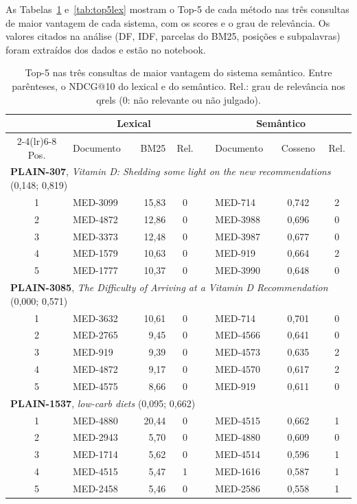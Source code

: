 \documentclass[11pt,a4paper]{article}
\begin{document}
As Tabelas~\ref{tab:top5sem} e~\ref{tab:top5lex} mostram o Top-5 de cada método nas três consultas de maior vantagem de cada sistema, com os scores e o grau de relevância. Os valores citados na análise (DF, IDF, parcelas do BM25, posições e subpalavras) foram extraídos dos dados e estão no notebook.

\begin{table}[!htb]
\centering\footnotesize
\setlength{\tabcolsep}{5pt}
\caption{Top-5 nas três consultas de maior vantagem do sistema semântico. Entre parênteses, o NDCG@10 do lexical e do semântico. Rel.: grau de relevância nos qrels (0: não relevante ou não julgado).}
\label{tab:top5sem}
\begin{tabular*}{0.92\linewidth}{@{\extracolsep{\fill}}clrcclcc}
\toprule
 & \multicolumn{3}{c}{Lexical} & & \multicolumn{3}{c}{Semântico} \\
\cmidrule(lr){2-4}\cmidrule(lr){6-8}
Pos. & Documento & BM25 & Rel. & & Documento & Cosseno & Rel. \\
\midrule
\multicolumn{8}{l}{\textbf{PLAIN-307}, \emph{Vitamin D: Shedding some light on the new recommendations} (0,148; 0,819)} \\
1 & MED-3099 & 15,83 & 0 & & MED-714 & 0,742 & 2 \\
2 & MED-4872 & 12,86 & 0 & & MED-3988 & 0,696 & 0 \\
3 & MED-3373 & 12,48 & 0 & & MED-3987 & 0,677 & 0 \\
4 & MED-1579 & 10,63 & 0 & & MED-919 & 0,664 & 2 \\
5 & MED-1777 & 10,37 & 0 & & MED-3990 & 0,648 & 0 \\
\midrule
\multicolumn{8}{l}{\textbf{PLAIN-3085}, \emph{The Difficulty of Arriving at a Vitamin D Recommendation} (0,000; 0,571)} \\
1 & MED-3632 & 10,61 & 0 & & MED-714 & 0,701 & 0 \\
2 & MED-2765 & 9,45 & 0 & & MED-4566 & 0,641 & 0 \\
3 & MED-919 & 9,39 & 0 & & MED-4573 & 0,635 & 2 \\
4 & MED-4872 & 9,17 & 0 & & MED-4570 & 0,617 & 2 \\
5 & MED-4575 & 8,66 & 0 & & MED-919 & 0,611 & 0 \\
\midrule
\multicolumn{8}{l}{\textbf{PLAIN-1537}, \emph{low-carb diets} (0,095; 0,662)} \\
1 & MED-4880 & 20,44 & 0 & & MED-4515 & 0,662 & 1 \\
2 & MED-2943 & 5,70 & 0 & & MED-4880 & 0,609 & 0 \\
3 & MED-1714 & 5,62 & 0 & & MED-4514 & 0,596 & 1 \\
4 & MED-4515 & 5,47 & 1 & & MED-1616 & 0,587 & 1 \\
5 & MED-2458 & 5,46 & 0 & & MED-2586 & 0,558 & 1 \\
\bottomrule
\end{tabular*}
\end{table}
\end{document}
